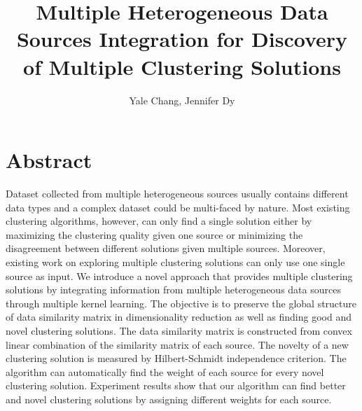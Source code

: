 \documentclass{article}
\title{Multiple Heterogeneous Data Sources Integration for Discovery of Multiple Clustering Solutions}
\author{Yale Chang,	Jennifer Dy}
\begin{document}
\maketitle
\section{Abstract}
Dataset collected from multiple heterogeneous sources usually contains 
different data types and a complex dataset could be multi-faced by nature.
Most existing clustering algorithms, however, can only find a single solution
either by maximizing the clustering quality given one source or minimizing the
disagreement between different solutions given multiple sources. Moreover, 
existing work on exploring multiple clustering solutions can only use one 
single source as input. We introduce a novel approach that provides multiple
clustering solutions by integrating information from multiple heterogeneous 
data sources through multiple kernel learning. The objective is to preserve 
the global structure of data similarity matrix in dimensionality reduction as
well as finding good and novel clustering solutions. The data similarity 
matrix is constructed from convex linear combination of the similarity matrix
of each source. The novelty of a new clustering solution is measured by 
Hilbert-Schmidt independence criterion. The algorithm can automatically find
the weight of each source for every novel clustering solution. Experiment 
results show that our algorithm can find better and novel clustering solutions
by assigning different weights for each source.
\end{document}
